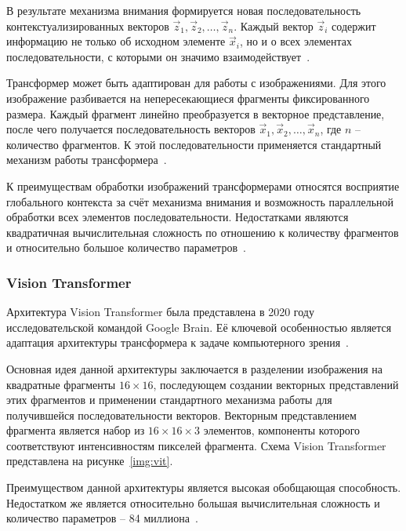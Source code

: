 В результате механизма внимания формируется новая последовательность контекстуализированных векторов $\vec{z}_1, \vec{z}_2, \ldots, \vec{z}_n$. Каждый вектор $\vec{z}_i$ содержит информацию не только об исходном элементе $\vec{x}_i$, но и о всех элементах последовательности, с которыми он значимо взаимодействует~\cite{attention}.

Трансформер может быть адаптирован для работы с изображениями. Для этого изображение разбивается на непересекающиеся фрагменты фиксированного размера. Каждый фрагмент линейно преобразуется в векторное представление, после чего получается последовательность векторов $\vec{x}_1, \vec{x}_2, \ldots, \vec{x}_n$, где $n$ -- количество фрагментов. К этой последовательности применяется стандартный механизм работы трансформера~\cite{vit}.

К преимуществам обработки изображений трансформерами относятся восприятие глобального контекста за счёт механизма внимания и  возможность параллельной обработки всех элементов последовательности. Недостатками являются квадратичная вычислительная сложность по отношению к количеству фрагментов и относительно большое количество параметров~\cite{attention}.

\subsubsection{Vision Transformer}

Архитектура Vision Transformer была представлена в 2020 году исследовательской командой Google Brain. Её ключевой особенностью является адаптация архитектуры трансформера к задаче компьютерного зрения~\cite{vit}.

Основная идея данной архитектуры заключается в разделении изображения на квадратные фрагменты $16\times16$, последующем создании векторных представлений этих фрагментов и применении стандартного механизма работы для получившейся последовательности векторов. Векторным представлением фрагмента является набор из $16\times16\times3$ элементов, компоненты которого соответствуют интенсивностям пикселей фрагмента. Схема Vision Transformer представлена на рисунке~\ref{img:vit}.

Преимуществом данной архитектуры является высокая обобщающая способность. Недостатком же является относительно большая вычислительная сложность и количество параметров -- 84 миллиона~\cite{vit}.

